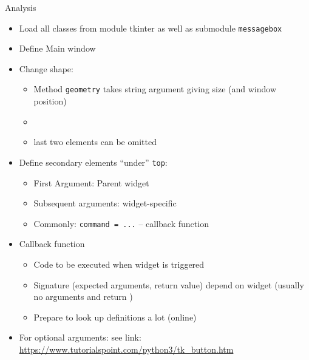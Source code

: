 \begin{frame}[fragile]{Analysis}
%
\begin{itemize}
\item Load all classes from module tkinter as well as submodule \texttt{messagebox}
\item Define Main window
\item Change shape: 
	\begin{itemize}
	\item Method \texttt{geometry} takes string argument giving size (and window position)
	\item {}
	\item last two elements can be omitted
	\end{itemize}
\item Define secondary elements \enquote{under} \texttt{top}: 
	\begin{itemize}
	\item First Argument: Parent widget
	\item Subsequent arguments: widget-specific
	\item Commonly: \texttt{command = ...} -- callback function
	\end{itemize}
\item Callback function
	\begin{itemize}
	\item Code to be executed when widget is triggered
	\item Signature (expected arguments, return value) depend on widget (usually no arguments and return )
	\item Prepare to look up definitions a lot (\eg online)
	\end{itemize}
\item For optional arguments: see link: {\scriptsize \url{https://www.tutorialspoint.com/python3/tk_button.htm}}
\end{itemize}
%
\end{frame}


